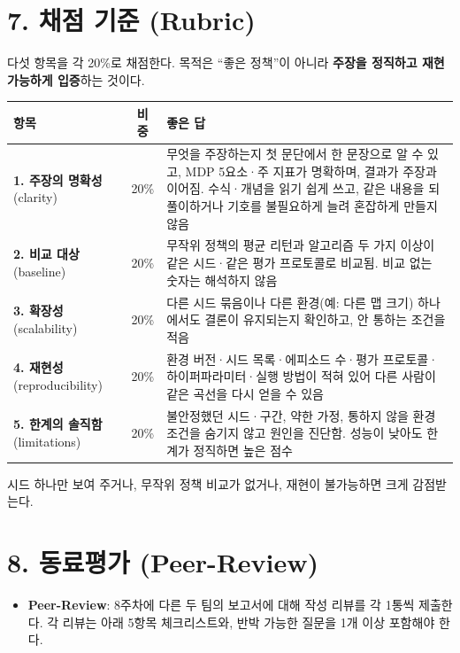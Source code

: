 \documentclass[12pt]{article}
\begin{document}
\newpage
\section*{7. 채점 기준 (Rubric)}
다섯 항목을 각 20\%로 채점한다. 목적은 ``좋은 정책''이 아니라 \textbf{주장을 정직하고 재현 가능하게 입증}하는 것이다.
\begin{center}
\small
\begin{tabular}{@{}p{3.3cm}cp{7.4cm}@{}}
\toprule
항목 & 비중 & 좋은 답 \\
\midrule
\textbf{1. 주장의 명확성} (clarity) & 20\% & 무엇을 주장하는지 첫 문단에서 한 문장으로 알 수 있고, MDP 5요소·주 지표가 명확하며, 결과가 주장과 이어짐. 수식·개념을 읽기 쉽게 쓰고, 같은 내용을 되풀이하거나 기호를 불필요하게 늘려 혼잡하게 만들지 않음 \\
\textbf{2. 비교 대상} (baseline) & 20\% & 무작위 정책의 평균 리턴과 알고리즘 두 가지 이상이 같은 시드·같은 평가 프로토콜로 비교됨. 비교 없는 숫자는 해석하지 않음 \\
\textbf{3. 확장성} (scalability) & 20\% & 다른 시드 묶음이나 다른 환경(예: 다른 맵 크기) 하나에서도 결론이 유지되는지 확인하고, 안 통하는 조건을 적음 \\
\textbf{4. 재현성} (reproducibility) & 20\% & 환경 버전·시드 목록·에피소드 수·평가 프로토콜·하이퍼파라미터·실행 방법이 적혀 있어 다른 사람이 같은 곡선을 다시 얻을 수 있음 \\
\textbf{5. 한계의 솔직함} (limitations) & 20\% & 불안정했던 시드·구간, 약한 가정, 통하지 않을 환경 조건을 숨기지 않고 원인을 진단함. 성능이 낮아도 한계가 정직하면 높은 점수 \\
\bottomrule
\end{tabular}
\end{center}
\vspace{4pt}
시드 하나만 보여 주거나, 무작위 정책 비교가 없거나, 재현이 불가능하면 크게 감점받는다.

\section*{8. 동료평가 (Peer-Review)}
\begin{itemize}
\item \textbf{Peer-Review}: 8주차에 다른 두 팀의 보고서에 대해 작성 리뷰를 각 1통씩 제출한다. 각 리뷰는 아래 5항목 체크리스트와, 반박 가능한 질문을 1개 이상 포함해야 한다.
\end{itemize}
\end{document}
